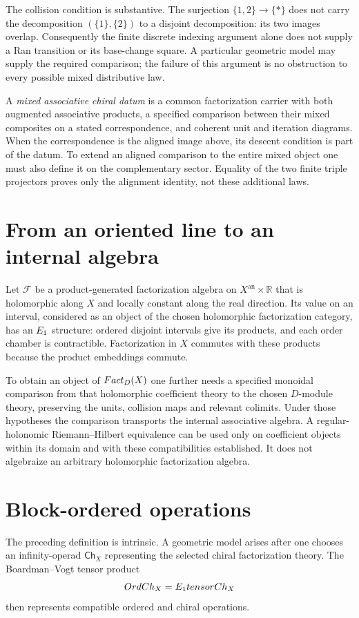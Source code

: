The collision condition is substantive. The surjection
$\{1,2\}\to\{*\}$ does not carry the decomposition
$(\{1\},\{2\})$ to a disjoint decomposition: its two images overlap.
Consequently the finite discrete indexing argument alone does not supply a
Ran transition or its base-change square.
A particular geometric model may supply the required comparison; the failure
of this argument is no obstruction to every possible mixed distributive law.

A \emph{mixed associative chiral datum} is a common factorization carrier with
both augmented associative products, a specified comparison between their mixed
composites on a stated correspondence, and coherent unit and iteration diagrams.
When the correspondence is the aligned image above, its descent condition is
part of the datum. To extend an aligned comparison to the entire mixed object
one must also define it on the complementary sector. Equality of the two
finite triple projectors proves only the alignment identity, not these additional laws.

\section{From an oriented line to an internal algebra}
Let $\mathcal F$ be a product-generated factorization algebra on
$X^{\mathrm{an}}\times\mathbb R$ that is holomorphic along $X$ and locally
constant along the real direction. Its value on an interval, considered as an
object of the chosen holomorphic factorization category, has an $E_1$ structure:
ordered disjoint intervals give its products, and each order chamber is contractible.
Factorization in $X$ commutes with these products because the product embeddings commute.

To obtain an object of $Fact_D(X)$ one further needs a specified monoidal
comparison from that holomorphic coefficient theory to the chosen $D$-module theory,
preserving the units, collision maps and relevant colimits.
Under those hypotheses the comparison transports the internal associative algebra.
A regular-holonomic Riemann--Hilbert equivalence can be used only on coefficient
objects within its domain and with these compatibilities established.
It does not algebraize an arbitrary holomorphic factorization algebra.

\section{Block-ordered operations}
The preceding definition is intrinsic. A geometric model arises after one chooses an infinity-operad $\mathsf{Ch}_X$ representing the selected chiral factorization theory. The Boardman--Vogt tensor product
\[
 OrdCh_X=E_1tensorCh_X
\]
then represents compatible ordered and chiral operations.

